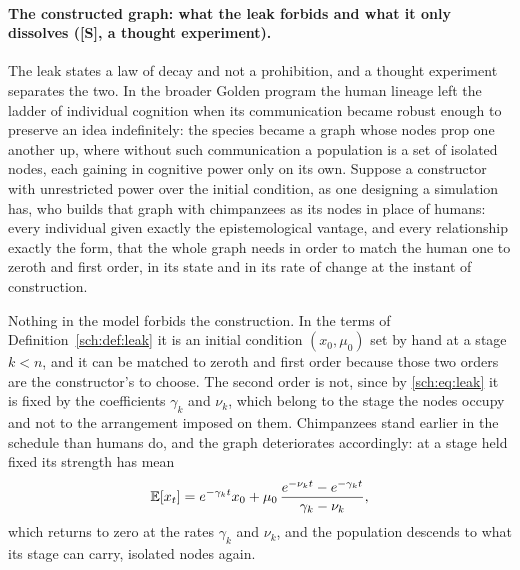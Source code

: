 \paragraph{The constructed graph: what the leak forbids and what it only dissolves (\textbf{[S]}, a thought experiment).}\label{sch:par:constructedgraph}
The leak states a law of decay and not a prohibition, and a thought
experiment separates the two. In the broader Golden program the human lineage left the ladder of
individual cognition when its communication became robust enough to
preserve an idea indefinitely: the species became a graph whose nodes
prop one another up, where without such communication a population is a
set of isolated nodes, each gaining in cognitive power only on its own.
Suppose a constructor with unrestricted power over the initial condition,
as one designing a simulation has, who builds that graph with chimpanzees
as its nodes in place of humans: every individual given exactly the
epistemological vantage, and every relationship exactly the form, that
the whole graph needs in order to match the human one to zeroth and first
order, in its state and in its rate of change at the instant of
construction.

Nothing in the model forbids the construction. In the terms of
Definition~\ref{sch:def:leak} it is an initial condition $(x_0,\mu_0)$
set by hand at a stage $k<n$, and it can be matched to zeroth and first
order because those two orders are the constructor's to choose. The
second order is not, since by \eqref{sch:eq:leak} it is fixed by the
coefficients $\gamma_k$ and $\nu_k$, which belong to the stage the nodes
occupy and not to the arrangement imposed on them. Chimpanzees stand
earlier in the schedule than humans do, and the graph deteriorates
accordingly: at a stage held fixed its strength has mean
\[
\mathbb{E}[x_t]=e^{-\gamma_kt}x_0+\mu_0\,\frac{e^{-\nu_kt}-e^{-\gamma_kt}}{\gamma_k-\nu_k},
\]
which returns to zero at the rates $\gamma_k$ and $\nu_k$, and the
population descends to what its stage can carry, isolated nodes again.

